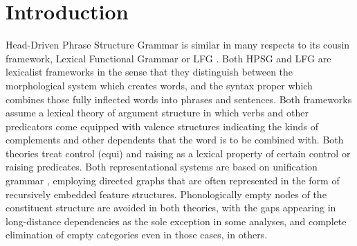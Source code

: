 






\label{chap-lfg}

\maketitle


\section{Introduction} 
Head-Driven Phrase Structure Grammar is similar in many respects to its cousin framework, Lexical Functional Grammar or LFG \citep{BATW2015a,Dalrymple2001a-u}.  Both  HPSG and LFG are lexicalist frameworks in the sense that they distinguish between the morphological system which creates words, and the syntax proper which combines those fully inflected words into phrases and sentences.  Both frameworks assume a lexical theory of argument structure \citep{MWArgSt} in which verbs and other predicators come equipped with valence structures indicating the kinds of complements and other dependents that the word is to be combined with.  Both theories treat control (equi) and raising as a lexical property of certain control or raising predicates.  Both  representational systems  are based on unification grammar \citep{Kay84a-u}, employing directed graphs that are often represented in the form of recursively embedded feature structures.   Phonologically empty nodes of the constituent structure are avoided in both theories, with the gaps appearing in long-distance dependencies as the sole exception in some analyses, and complete elimination of empty categories even in those cases, in others.   

